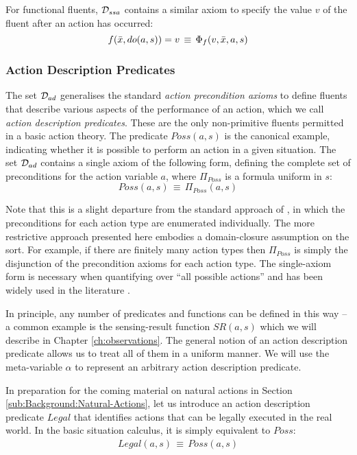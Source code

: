 For functional fluents, $\mathcal{D}_{ssa}$ contains a similar axiom to specify
the value $v$ of the fluent after an action has occurred:\[
f(\bar{x},do(a,s))=v\,\equiv\,\Phi_{f}(v,\bar{x},a,s)\]



\subsubsection{Action Description Predicates}

The set $\mathcal{D}_{ad}$ generalises the standard \emph{action precondition
axioms} \citep{pirri99contributions_sitcalc} to define fluents that
describe various aspects of the performance of an action, which we
call \emph{action description predicates}. These are the only non-primitive
fluents permitted in a basic action theory. The predicate $Poss(a,s)$
is the canonical example, indicating whether it is possible to perform
an action in a given situation. The set $\mathcal{D}_{ad}$ contains a single
axiom of the following form, defining the complete set of preconditions
for the action variable $a$, where $\Pi_{Poss}$ is a formula uniform
in $s$:\[
Poss(a,s)\,\equiv\,\Pi_{Poss}(a,s)\]


Note that this is a slight departure from the standard approach of
\citep{pirri99contributions_sitcalc}, in which the preconditions
for each action type are enumerated individually. The more restrictive
approach presented here embodies a domain-closure assumption on the
 sort. For example, if there are finitely many action
types then $\Pi_{Poss}$ is simply the disjunction of the precondition
axioms for each action type. The single-axiom form is necessary when
quantifying over {}``all possible actions'' and has been widely
used in the literature \citep{vassos08progression_future_queries,savelli06sc_quantum_levels}.

In principle, any number of predicates and functions can be defined
in this way -- a common example is the sensing-result function $SR(a,s)$
which we will describe in Chapter \ref{ch:observations}. The general
notion of an action description predicate allows us to treat all of
them in a uniform manner. We will use the meta-variable $\alpha$
to represent an arbitrary action description predicate.

In preparation for the coming material on natural actions in Section
\ref{sub:Background:Natural-Actions}, let us introduce an action
description predicate $Legal$ that identifies actions that can be
legally executed in the real world. In the basic situation calculus,
it is simply equivalent to $Poss$:\begin{gather*}
Legal(a,s)\,\equiv\, Poss(a,s)\end{gather*}



